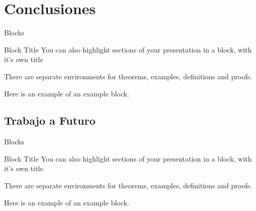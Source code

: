 \documentclass[aspectratio=169]{beamer}
\begin{document}
\section{Conclusiones}

\begin{frame}{Blocks}
\begin{block}{Block Title}
You can also highlight sections of your presentation in a block, with it's own title
\end{block}
\begin{theorem}
There are separate environments for theorems, examples, definitions and proofs.
\end{theorem}
\begin{example}
Here is an example of an example block.
\end{example}
\end{frame}

\subsection{Trabajo a Futuro}

\begin{frame}{Blocks}
\begin{block}{Block Title}
You can also highlight sections of your presentation in a block, with it's own title
\end{block}
\begin{theorem}
There are separate environments for theorems, examples, definitions and proofs.
\end{theorem}
\begin{example}
Here is an example of an example block.
\end{example}
\end{frame}
\end{document}
